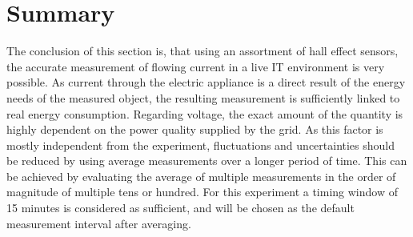 \section{Summary}
The conclusion of this section is, that using an assortment of hall effect sensors, the accurate measurement of flowing current in a live IT environment is very possible. As current through the electric appliance is a direct result of the energy needs of the measured object, the resulting measurement is sufficiently linked to real energy consumption.
Regarding voltage, the exact amount of the quantity is highly dependent on the power quality supplied by the grid. As this factor is mostly independent from the experiment, fluctuations and uncertainties should be reduced by using average measurements over a longer period of time. This can be achieved by evaluating the average of multiple measurements in the order of magnitude of multiple tens or hundred. For this experiment a timing window of 15 minutes is considered as sufficient, and will be chosen as the default measurement interval after averaging.

\pagebreak

\clearpage